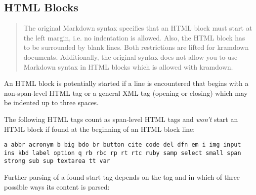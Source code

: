 \documentclass[a4paper]{article}
\begin{document}
\hypertarget{html-blocks}{\subsection{HTML Blocks}\label{html-blocks}}

\begin{quote}
The original Markdown syntax specifies that an HTML block must start at
the left margin, i.e. no indentation is allowed. Also, the HTML block
has to be surrounded by blank lines. Both restrictions are lifted for
kramdown documents. Additionally, the original syntax does not allow you
to use Markdown syntax in HTML blocks which is allowed with kramdown.
\end{quote}

An HTML block is potentially started if a line is encountered that
begins with a non-span-level HTML tag or a general XML tag (opening or
closing) which may be indented up to three spaces.

The following HTML tags count as span-level HTML tags and \emph{won't}
start an HTML block if found at the beginning of an HTML block line:

\begin{verbatim}
a abbr acronym b big bdo br button cite code del dfn em i img input
ins kbd label option q rb rbc rp rt rtc ruby samp select small span
strong sub sup textarea tt var
\end{verbatim}

Further parsing of a found start tag depends on the tag and in which of
three possible ways its content is parsed:
\end{document}
